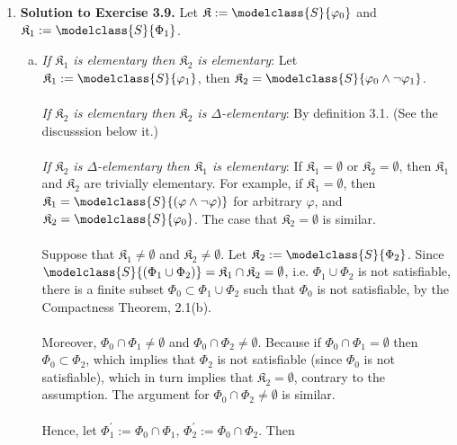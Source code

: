 \begin{enumerate}[1.]
%
\item \textbf{Solution to Exercise 3.9.} Let $\mathfrak{K} := \modelclass{S}{\varphi_0}$ and $\mathfrak{K}_1 := \modelclass{S}{\Phi_1}$.
\begin{enumerate}[(a)]
\item \textit{If $\mathfrak{K}_1$ is elementary then $\mathfrak{K}_2$ is elementary}: Let $\mathfrak{K}_1 := \modelclass{S}{\varphi_1}$, then $\mathfrak{K}_2 = \modelclass{S}{\varphi_0 \land \neg\varphi_1}$.\\
\\
\textit{If $\mathfrak{K}_2$ is elementary then $\mathfrak{K}_2$ is $\Delta$-elementary}: By definition 3.1. (See the discusssion below it.)\\
\\
\textit{If $\mathfrak{K}_2$ is $\Delta$-elementary then $\mathfrak{K}_1$ is elementary}: If $\mathfrak{K}_1 = \emptyset$ or $\mathfrak{K}_2 = \emptyset$, then $\mathfrak{K}_1$ and $\mathfrak{K}_2$ are trivially elementary. For example, if $\mathfrak{K}_1 = \emptyset$, then  $\mathfrak{K}_1 = \modelclass{S}{(\varphi \land \neg \varphi)}$ for arbitrary $\varphi$, and $\mathfrak{K}_2 = \modelclass{S}{\varphi_0}$. The case that $\mathfrak{K}_2 = \emptyset$ is similar.\\
\\
Suppose that $\mathfrak{K}_1 \not = \emptyset$ and $\mathfrak{K}_2 \not = \emptyset$. Let $\mathfrak{K}_2 := \modelclass{S}{\Phi_2}$. Since $\modelclass{S}{(\Phi_1 \cup \Phi_2)} = \mathfrak{K}_1 \cap \mathfrak{K}_2 = \emptyset$, i.e. $\Phi_1 \cup \Phi_2$ is not satisfiable, there is a finite subset $\Phi_0 \subset \Phi_1 \cup \Phi_2$ such that $\Phi_0$ is not satisfiable, by the Compactness Theorem, 2.1(b).\\
\\
Moreover, $\Phi_0 \cap \Phi_1 \not = \emptyset$ and $\Phi_0 \cap \Phi_2 \not = \emptyset$. Because if $\Phi_0 \cap \Phi_1 = \emptyset$ then $\Phi_0 \subset \Phi_2$, which implies that $\Phi_2$ is not satisfiable (since $\Phi_0$ is not satisfiable), which in turn implies that $\mathfrak{K}_2 = \emptyset$, contrary to the assumption. The argument for $\Phi_0 \cap \Phi_2 \not = \emptyset$ is similar.\\
\\
\setcounter{equation}{0}
Hence, let $\Phi_1^\prime := \Phi_0 \cap \Phi_1$, $\Phi_2^\prime := \Phi_0 \cap \Phi_2$. Then

\end{enumerate}
\end{enumerate}
